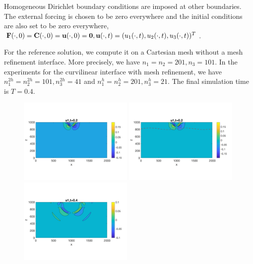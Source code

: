 Homogeneous Dirichlet boundary conditions are imposed at other boundaries. The external forcing is chosen to be zero everywhere and the initial conditions are also set to be zero everywhere, ${\bf F}(\cdot,0) = {\bf C}(\cdot,0) = {\bf u}(\cdot,0) = {\bf 0}, {\bf u}(\cdot,t) = (u_1(\cdot,t), u_2(\cdot,t), u_3(\cdot,t))^T$.

For the reference solution, we compute it on a Cartesian mesh without a mesh refinement interface. More precisely, we have $n_1 = n_2 = 201, n_3 = 101$. In the experiments for the curvilinear interface with mesh refinement, we have $n_1^{2h} = n_2^{2h} = 101, n_3^{2h} = 41$ and $n_1^h = n_2^h = 201, n_3^h = 21$. The final simulation time is $T = 0.4$.

\begin{figure}[htbp]
	\centering
	\includegraphics[width=0.49\textwidth,trim={0 2.8cm 0 2.8cm}, clip]{u1_t02_cartesian.png}
	\includegraphics[width=0.49\textwidth,trim={0 2.8cm 0 2.8cm}, clip]{u1_t02_curvi_mr.png}\\
	\includegraphics[width=0.49\textwidth,trim={0 2.8cm 0 2.8cm}, clip]{u1_t04_cartesian.png}

\end{figure}
